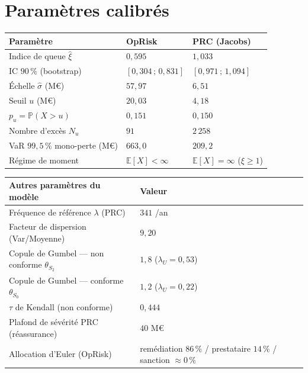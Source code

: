 \documentclass[11pt,a4paper]{article}
\theoremstyle{navystyle}
\theoremstyle{navydef}
\newcommand{\E}{\mathbb{E}}
\newcommand{\Prob}{\mathbb{P}}
\begin{document}
\clearpage
\section{Paramètres calibrés}
\label{ann:parametres}

\renewcommand{\arraystretch}{1.25}
\begin{center}
\begin{tabular}{>{\raggedright}p{5cm} >{\centering}p{3.2cm} >{\centering\arraybackslash}p{3.2cm}}
\toprule
\rowcolor{lightblue}
\textbf{Paramètre} & \textbf{OpRisk} & \textbf{PRC (Jacobs)} \\
\midrule
Indice de queue $\hat\xi$ & $0{,}595$ & $1{,}033$ \\
\quad IC $90\,\%$ (bootstrap) & $[0{,}304\,;\,0{,}831]$ & $[0{,}971\,;\,1{,}094]$ \\
Échelle $\hat\sigma$ (M\euro) & $57{,}97$ & $6{,}51$ \\
Seuil $u$ (M\euro) & $20{,}03$ & $4{,}18$ \\
$p_u=\Prob(X>u)$ & $0{,}151$ & $0{,}150$ \\
Nombre d'excès $N_u$ & $91$ & $2\,258$ \\
VaR $99{,}5\,\%$ mono-perte (M\euro) & $663{,}0$ & $209{,}2$ \\
Régime de moment & $\E[X]<\infty$ & $\E[X]=\infty$ ($\xi\ge1$) \\
\bottomrule
\end{tabular}

\vspace{0.8em}

\begin{tabular}{>{\raggedright}p{7cm} >{\centering\arraybackslash}p{4cm}}
\toprule
\rowcolor{lightblue}
\textbf{Autres paramètres du modèle} & \textbf{Valeur} \\
\midrule
Fréquence de référence $\lambda$ (PRC) & $341$ /an \\
Facteur de dispersion (Var/Moyenne) & $9{,}20$ \\
Copule de Gumbel --- non conforme $\theta_{S_2}$ & $1{,}8$ ($\lambda_U=0{,}53$) \\
Copule de Gumbel --- conforme $\theta_{S_0}$ & $1{,}2$ ($\lambda_U=0{,}22$) \\
$\tau$ de Kendall (non conforme) & $0{,}444$ \\
Plafond de sévérité PRC (réassurance) & $40$ M\euro \\
Allocation d'Euler (OpRisk) & remédiation $86\,\%$ / prestataire $14\,\%$ / sanction $\approx0\,\%$ \\
\bottomrule
\end{tabular}
\end{center}


\clearpage


\end{document}
